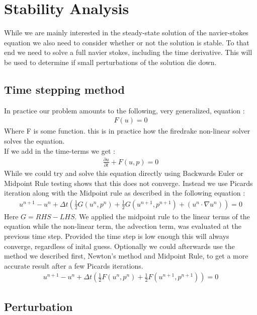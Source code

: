 \documentclass[11pt,twoside,a4paper]{article}
\begin{document}
\section{Stability Analysis}

While we are mainly interested in the steady-state solution of the navier-stokes equation we also need to consider whether or not the solution is stable. To that end we need to solve a full navier stokes, including the time derivative. This will be used to determine if small perturbations of the solution die down.
\subsection{Time stepping method}
In practice our problem amounts to the following, very generalized, equation : 
\begin{align}
F(u) = 0
\end{align}
Where F is some function. this is in practice how the firedrake non-linear solver solves the equation.\\
If we add in the time-terms we get :
\begin{align}
\frac{\partial u}{\partial t} + F(u,p) = 0
\end{align}
While we could try and solve this equation directly using Backwards Euler or Midpoint Rule testing shows that this does not converge. Instead we use Picards iteration along with the Midpoint rule as described in the following equation :
\begin{align}
u^{n+1} - u^n + \Delta t (\frac{1}{2}G(u^n,p^n) + \frac{1}{2} G(u^{n+1},p^{n+1}) + ( u^n \cdot \nabla u^n) ) = 0
\end{align}
Here $G = RHS - LHS $. We applied the midpoint rule to the linear terms of the equation while the non-linear term, the advection term, was evaluated at the previous time step. Provided the time step is low enough this will always converge, regardless of inital guess.
Optionally we could afterwards use the method we described first, Newton's method and Midpoint Rule, to get a more accurate result after a few Picards iterations.
\begin{align}
u^{n+1} - u^n + \Delta t (\frac{1}{2}F(u^n,p^n) + \frac{1}{2} F(u^{n+1},p^{n+1})) = 0
\end{align}

\subsection{Perturbation}
\end{document}
